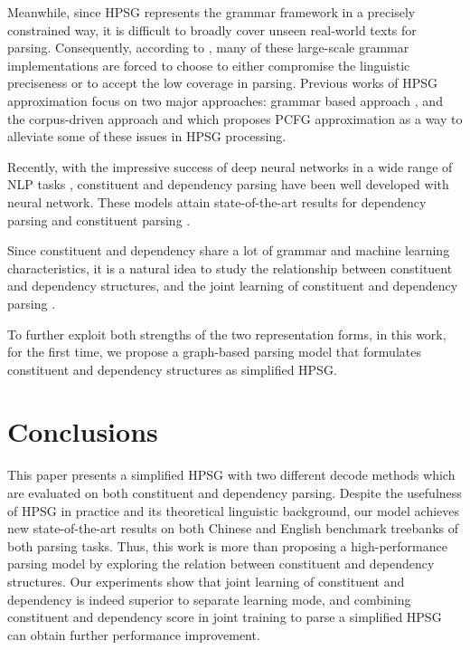 \documentclass[11pt,a4paper]{article}
\begin{document}
Meanwhile, since HPSG represents the grammar framework in a precisely constrained way, it is difficult to broadly cover unseen real-world texts for parsing. 
Consequently, according to \cite{Zhang-W11-2923}, 
many of these large-scale grammar implementations are forced to choose to either compromise the linguistic preciseness or to accept the low coverage in parsing. 
Previous works of HPSG approximation focus on two major approaches: grammar based approach \cite{kiefer2004context}, and the corpus-driven approach \cite{krieger2007ubgs} and \cite{Zhang-W11-2923} which proposes PCFG approximation as a way to alleviate some of these issues in HPSG processing.

Recently, with the impressive success of deep neural networks in a wide range of NLP tasks \cite{li-etal-2018-unified, zhang-etal-2018-exploring, li-etal-2018-joint-learning, zhang-etal-2018-modeling, zhang-etal-2018-subword, zhang-zhao-2018-one, cai-etal-2018-full, he-etal-2018-syntax, xiao2019latt, AAAI1816060, 8360031, wang-etal-2018-dynamic, wang-etal-2017-instance, wang-etal-2017-sentence}, constituent and dependency parsing have been well developed with neural network. These models attain state-of-the-art results for dependency parsing \cite{ChenD14, Dozat2017Deep, Ma2018Stack} and constituent parsing \cite{Dyer-N16-1024, Cross, Kitaev-2018-SelfAttentive}. 

Since constituent and dependency share a lot of grammar and machine learning characteristics, it is a natural idea to study the relationship between constituent and dependency structures, and the joint learning of constituent and dependency parsing \cite{CollinsP97-1003,CharniakA00-2018,CharniakP05-1022,FarkasW11-2924,GreenW12-0503,RenCombine2013,YoshikawaP17-1026}.

To further exploit both strengths of the two representation forms, in this work, for the first time, we propose a graph-based parsing model that formulates constituent and dependency structures as simplified HPSG.

\section{Conclusions}

This paper presents a simplified HPSG with two different decode methods which are evaluated on both constituent and dependency parsing. Despite the usefulness of HPSG in practice and its theoretical linguistic background, our model achieves new state-of-the-art results on both Chinese and English benchmark treebanks of both parsing tasks. Thus, this work is more than proposing a high-performance parsing model by exploring the relation between constituent and dependency structures. 
Our experiments show that joint learning of constituent and dependency is indeed superior to separate learning mode, and combining constituent and dependency score in joint training to parse a simplified HPSG can obtain further performance improvement.




\end{document}
